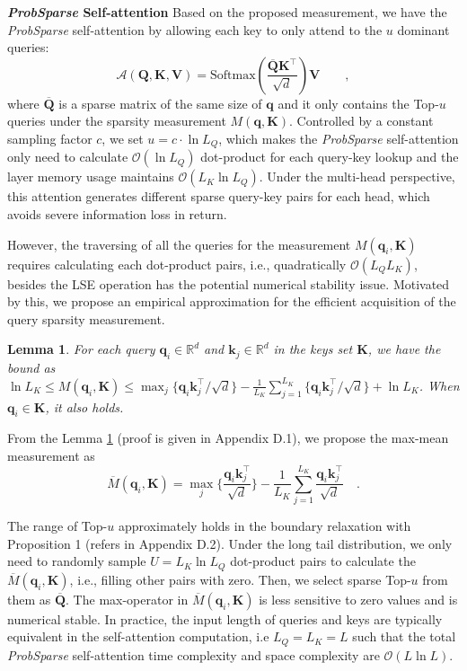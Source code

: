 \documentclass[letterpaper]{article} %
\newtheorem{lemma}{\textbf{Lemma}}
\newcommand{\mb}{\mathbf}
\newcommand{\bigO}{\mathcal{O}}
\begin{document}
\textbf{\emph{ProbSparse} Self-attention}
Based on the proposed measurement, we have the \emph{ProbSparse} self-attention by allowing each key to only attend to the $u$ dominant queries:
\begin{equation}
\label{eq:method.probsparse}
    \mathcal{A} (\mb{Q}, \mb{K}, \mb{V}) = \textrm{Softmax} (\frac{\overline{\mb{Q}}\mb{K}^{\top}}{\sqrt{d}})\mb{V} \qquad,
\end{equation}
where $\overline{\mb{Q}}$ is a sparse matrix of the same size of $\mb{q}$ and it only contains the Top-$u$ queries under the sparsity measurement $M(\mb{q},\mb{K})$. Controlled by a constant sampling factor $c$, we set $u=c \cdot \ln{L_Q}$, which makes the \emph{ProbSparse} self-attention only need to calculate $\bigO(\ln{L_Q})$ dot-product for each query-key lookup and the layer memory usage maintains $\bigO(L_K\ln{L_Q})$. Under the multi-head perspective, this attention generates different sparse query-key pairs for each head, which avoids severe information loss in return.

However, the traversing of all the queries for the measurement $M(\mb{q}_i,\mb{K})$ requires calculating each dot-product pairs, i.e., quadratically $\bigO(L_Q L_K)$, besides the LSE operation has the potential numerical stability issue. Motivated by this, we propose an empirical approximation for the efficient acquisition of the query sparsity measurement.

\begin{lemma}
\label{le.M.bound}
For each query $\mb{q}_i \in \mathbb{R}^{d}$ and $\mb{k}_j \in \mathbb{R}^{d}$ in the keys set $\mb{K}$, we have the bound as
$\ln L_K \leq M (\mb{q}_i, \mb{K}) \leq \max_{j}\{{\mb{q}_i \mb{k}_j^{\top}}/{\sqrt{d}}\} - \frac{1}{L_K} \sum_{j=1}^{L_K} \{{\mb{q}_i\mb{k}_j^{\top}}/{\sqrt{d}} \} + \ln L_K$.
When $\mb{q}_i \in \mb{K}$, it also holds.
\end{lemma}

From the Lemma \ref{le.M.bound} (proof is given in Appendix D.1), we propose the max-mean measurement as
\begin{equation}
\label{eq.method.measure2}
    \overline{M} (\mb{q}_i, \mb{K}) = \max_{j}\{\frac{\mb{q}_i \mb{k}_j^{\top}}{\sqrt{d}}\} - \frac{1}{L_K} \sum_{j=1}^{L_K} \frac{\mb{q}_i\mb{k}_j^{\top}}{\sqrt{d}} \quad.
\end{equation}

The range of Top-$u$ approximately holds in the boundary relaxation with Proposition 1 (refers in Appendix D.2). Under the long tail distribution, we only need to randomly sample $U=L_K \ln L_Q$ dot-product pairs to calculate the $\overline{M} (\mb{q}_i, \mb{K})$, i.e., filling other pairs with zero. Then, we select sparse Top-$u$ from them as $\overline{\mb{Q}}$. The max-operator in $\overline{M} (\mb{q}_i, \mb{K})$ is less sensitive to zero values and is numerical stable. In practice, the input length of queries and keys are typically equivalent in the self-attention computation, i.e $L_Q=L_K=L$ such that the total \emph{ProbSparse} self-attention time complexity and space complexity are $\bigO(L \ln L)$.
\end{document}
